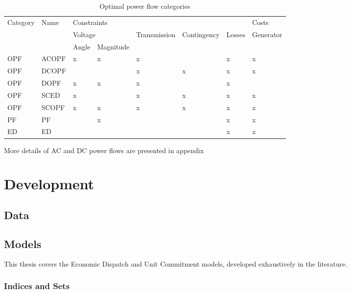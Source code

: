 \documentclass[12pt,LUDisStyle,twosided]{book}
\begin{document}
\begin{table}[h]
\centering
\caption{Optimal power flow categories \cite{cain}}
\label{table:PowerSystemsCat}
\begin{tabular}{|l|l|l|l|l|l|l|l|}
\hline
\multirow{3}{*}{Category} & \multirow{3}{*}{Name} & \multicolumn{5}{l|}{Constraints} & Costs \\ \cline{3-8} 
 &  & \multicolumn{2}{l|}{Voltage} & \multirow{2}{*}{Transmission} & \multirow{2}{*}{Contingency} & \multirow{2}{*}{Losses} & \multirow{2}{*}{Generator} \\ \cline{3-4}
 &  & Angle & Magnitude &  &  &  &  \\ \hline
OPF & ACOPF & x & x & x &  & x & x \\ \hline
OPF & DCOPF &  &  & x & x & x & x \\ \hline
OPF & DOPF & x & x & x &  & x &  \\ \hline
OPF & SCED & x &  & x & x & x & x \\ \hline
OPF & SCOPF & x & x & x & x & x & x \\ \hline
PF & PF &  & x &  &  & x & x \\ \hline
ED & ED &  &  &  &  & x & x \\ \hline
\end{tabular}
\end{table}

More details of AC and DC power flows are presented in appendix


\chapter{Development}
\section{Data}

\section{Models}

This thesis covers the Economic Dispatch and Unit Commitment models, developed exhaustively in the literature.

\subsection{Indices and Sets}
\end{document}
